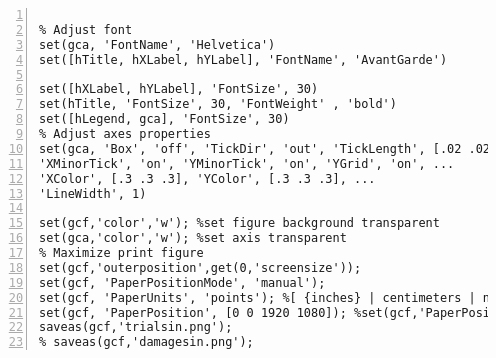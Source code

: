 \begin{lstlisting}[numbers=left, numberstyle=\tiny, keywordstyle=\color{blue!100}, commentstyle=\color{red!30!green!100!blue!100}, frame=shadowbox, rulesepcolor=\color{red!20!green!20!blue!20}]
% hTitle = title('Difference between cyclic load calculation and numerical method as function of time(time step=1/15000)' ,'Fontsize' ,30);

% Adjust font
set(gca, 'FontName', 'Helvetica')
set([hTitle, hXLabel, hYLabel], 'FontName', 'AvantGarde')

set([hXLabel, hYLabel], 'FontSize', 30)
set(hTitle, 'FontSize', 30, 'FontWeight' , 'bold')
set([hLegend, gca], 'FontSize', 30)
% Adjust axes properties
set(gca, 'Box', 'off', 'TickDir', 'out', 'TickLength', [.02 .02], ...
'XMinorTick', 'on', 'YMinorTick', 'on', 'YGrid', 'on', ...
'XColor', [.3 .3 .3], 'YColor', [.3 .3 .3], ...
'LineWidth', 1)

set(gcf,'color','w'); %set figure background transparent
set(gca,'color','w'); %set axis transparent
% Maximize print figure
set(gcf,'outerposition',get(0,'screensize'));
set(gcf, 'PaperPositionMode', 'manual');
set(gcf, 'PaperUnits', 'points'); %[ {inches} | centimeters | normalized | points ]
set(gcf, 'PaperPosition', [0 0 1920 1080]); %set(gcf,'PaperPosition',[left,bottom,width,height])
saveas(gcf,'trialsin.png');
% saveas(gcf,'damagesin.png');

\end{lstlisting}
